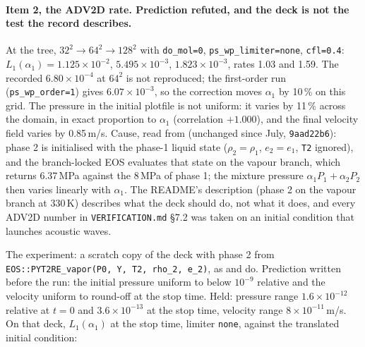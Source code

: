 \documentclass[11pt,a4paper]{article}
\newcommand{\code}[1]{\texttt{\small #1}}
\begin{document}
\paragraph{Item 2, the ADV2D rate.  Prediction refuted, and the deck is
not the test the record describes.}
At the tree, $32^2 \to 64^2 \to 128^2$ with \code{do\_mol=0},
\code{ps\_wp\_limiter=none}, \code{cfl=0.4}: $L_1(\alpha_1) = 1.125\times10^{-2}$,
$5.495\times10^{-3}$, $1.823\times10^{-3}$, rates 1.03 and 1.59.  The
recorded $6.80\times10^{-4}$ at $64^2$ is not reproduced; the first-order
run (\code{ps\_wp\_order=1}) gives $6.07\times10^{-3}$, so the correction
moves $\alpha_1$ by 10\,\% on this grid.  The pressure in the initial
plotfile is not uniform: it varies by 11\,\% across the domain, in exact
proportion to $\alpha_1$ (correlation $+1.000$), and the final velocity
field varies by 0.85\,m/s.  Cause, read from 
(unchanged since July, \code{9aad22b6}): phase 2 is initialised with the
phase-1 liquid state ($\rho_2 = \rho_1$, $e_2 = e_1$, \code{T2} ignored),
and the branch-locked EOS evaluates that state on the vapour branch, which
returns 6.37\,MPa against the 8\,MPa of phase 1; the mixture pressure
$\alpha_1 P_1 + \alpha_2 P_2$ then varies linearly with $\alpha_1$.  The
README's description (phase 2 on the vapour branch at 330\,K) describes
what the deck should do, not what it does, and every ADV2D number in
\code{VERIFICATION.md} \S7.2 was taken on an initial condition that
launches acoustic waves.

The experiment: a scratch copy of the deck with phase 2 from
\code{EOS::PYT2RE\_vapor(P0, Y, T2, rho\_2, e\_2)}, as 
and  do.  Prediction written before the run: the
initial pressure uniform to below $10^{-9}$ relative and the velocity
uniform to round-off at the stop time.  Held: pressure range
$1.6\times10^{-12}$ relative at $t=0$ and $3.6\times10^{-13}$ at the stop
time, velocity range $8\times10^{-11}$\,m/s.  On that deck, $L_1(\alpha_1)$
at the stop time, limiter \code{none}, against the translated initial
condition:
\end{document}
